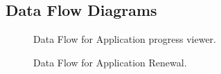 \documentclass[12pt]{article}
\begin{document}
\subsection{Data Flow Diagrams}



\begin{figure}[H]
\centering	
{}
\caption{Data Flow for Application progress viewer.}
\end{figure}

\begin{figure}[H]
\centering	
{}
\caption{Data Flow for Application Renewal.}
\end{figure}
\end{document}
